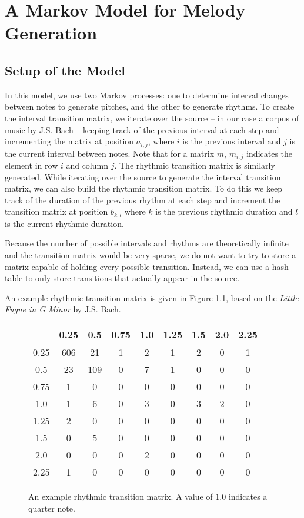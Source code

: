 \chapter{A Markov Model for Melody Generation} \label{markov}

\section{Setup of the Model} \label{markov:setup}

In this model, we use two Markov processes: one to determine interval changes between notes to generate pitches, and the other to generate rhythms.
To create the interval transition matrix, we iterate over the source -- in our case a corpus of music by J.S. Bach -- keeping track of the previous interval at each step and incrementing the matrix at position $a_{i,j}$, where $i$ is the previous interval and $j$ is the current interval between notes.
Note that for a matrix $m$, $m_{i,j}$ indicates the element in row $i$ and column $j$.
The rhythmic transition matrix is similarly generated.
While iterating over the source to generate the interval transition matrix, we can also build the rhythmic transition matrix.
To do this we keep track of the duration of the previous rhythm at each step and increment the transition matrix at position $b_{k,l}$ where $k$ is the previous rhythmic duration and $l$ is the current rhythmic duration.

Because the number of possible intervals and rhythms are theoretically infinite and the transition matrix would be very sparse, we do not want to try to store a matrix capable of holding every possible transition.
Instead, we can use a hash table to only store transitions that actually appear in the source.

An example rhythmic transition matrix is given in Figure \ref{fig:rhythmTransitionMatrix}, based on the \textit{Little Fugue in G Minor} by J.S. Bach.

\begin{figure}
	\centering
	\begin{tabular}{c | c c c c c c c c}
		& 0.25 & 0.5 & 0.75 & 1.0 & 1.25 & 1.5 & 2.0 & 2.25\\
		\hline
		0.25 & 606 & 21 & 1 & 2 & 1 & 2 & 0 & 1\\
		0.5 & 23 & 109 & 0 & 7 & 1 & 0 & 0 & 0\\
		0.75 & 1 & 0 & 0 & 0 & 0 & 0 & 0 & 0\\
		1.0 & 1 & 6 & 0 & 3 & 0 & 3 & 2 & 0\\
		1.25 & 2 & 0 & 0 & 0 & 0 & 0 & 0 & 0\\
		1.5 & 0 & 5 & 0 & 0 & 0 & 0 & 0 & 0\\
		2.0 & 0 & 0 & 0 & 2 & 0 & 0 & 0 & 0\\
		2.25 & 1 & 0 & 0 & 0 & 0 & 0 & 0 & 0
	\end{tabular}
	\caption{An example rhythmic transition matrix. A value of $1.0$ indicates a quarter note.}
	\label{fig:rhythmTransitionMatrix}
\end{figure}

